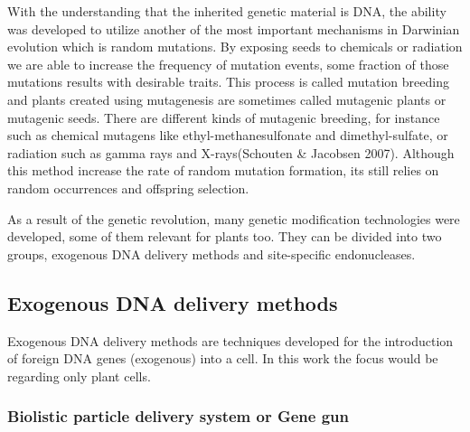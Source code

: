 \documentclass[
]{article}
\begin{document}
With the understanding that the inherited genetic material is DNA, the
ability was developed to utilize another of the most important
mechanisms in Darwinian evolution which is random mutations. By exposing
seeds to chemicals or radiation we are able to increase the frequency of
mutation events, some fraction of those mutations results with desirable
traits. This process is called mutation breeding and plants created
using mutagenesis are sometimes called mutagenic plants or mutagenic
seeds. There are different kinds of mutagenic breeding, for instance
such as chemical mutagens like ethyl-methanesulfonate and
dimethyl-sulfate, or radiation such as gamma rays and X-rays(Schouten \&
Jacobsen 2007). Although this method increase the rate of random
mutation formation, its still relies on random occurrences and offspring
selection.

As a result of the genetic revolution, many genetic modification
technologies were developed, some of them relevant for plants too. They
can be divided into two groups, exogenous DNA delivery methods and
site-specific endonucleases.

\hypertarget{exogenous-dna-delivery-methods}{%
\subsection{Exogenous DNA delivery
methods}\label{exogenous-dna-delivery-methods}}

Exogenous DNA delivery methods are techniques developed for the
introduction of foreign DNA genes (exogenous) into a cell. In this work
the focus would be regarding only plant cells.

\hypertarget{biolistic-particle-delivery-system-or-gene-gun}{%
\subsubsection{Biolistic particle delivery system or Gene
gun}\label{biolistic-particle-delivery-system-or-gene-gun}}
\end{document}
